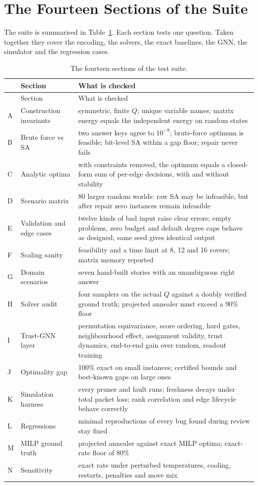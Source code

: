 \section{The Fourteen Sections of the Suite}

The suite is summarised in Table~\ref{tab:verify:sections}. Each section tests
one question. Taken together they cover the encoding, the solvers, the exact
baselines, the GNN, the simulator and the regression cases.

\begin{longtable}{@{}p{0.6cm}p{3.6cm}p{9.6cm}@{}}
\caption{The fourteen sections of the test suite.}\label{tab:verify:sections}\\
\toprule
& Section & What is checked \\
\midrule
\endfirsthead
\toprule
& Section & What is checked \\
\midrule
\endhead
A & Construction invariants & symmetric, finite $Q$; unique variable names; matrix energy equals the independent energy on random states \\
B & Brute force vs SA & two answer keys agree to $10^{-9}$; brute-force optimum is feasible; bit-level SA within a gap floor; repair never fails \\
C & Analytic optima & with constraints removed, the optimum equals a closed-form sum of per-edge decisions, with and without stability \\
D & Scenario matrix & 80 larger random worlds: raw SA may be infeasible, but after repair zero instances remain infeasible \\
E & Validation and edge cases & twelve kinds of bad input raise clear errors; empty problems, zero budget and default degree caps behave as designed; same seed gives identical output \\
F & Scaling sanity & feasibility and a time limit at 8, 12 and 16 rovers; matrix memory reported \\
G & Domain scenarios & seven hand-built stories with an unambiguous right answer \\
H & Solver audit & four samplers on the actual $Q$ against a doubly verified ground truth; projected annealer must exceed a 90\% floor \\
I & Trust-GNN layer & permutation equivariance, score ordering, hard gates, neighbourhood effect, assignment validity, trust dynamics, end-to-end gain over random, readout training \\
J & Optimality gap & 100\% exact on small instances; certified bounds and best-known gaps on large ones \\
K & Simulation harness & every pruner and fault runs; freshness decays under total packet loss; rank correlation and edge lifecycle behave correctly \\
L & Regressions & minimal reproductions of every bug found during review stay fixed \\
M & MILP ground truth & projected annealer against exact MILP optima; exact-rate floor of 80\% \\
N & Sensitivity & exact rate under perturbed temperatures, cooling, restarts, penalties and move mix \\
\bottomrule
\end{longtable}

